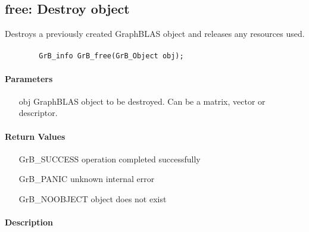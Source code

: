 \subsection{{\sf free}: Destroy object}

Destroys a previously created GraphBLAS object and releases any resources used.

\paragraph{\syntax}

\begin{verbatim}
        GrB_info GrB_free(GrB_Object obj);
\end{verbatim}


\paragraph{Parameters}

\begin{itemize}[leftmargin=1.1in]
	\item[{\sf obj}] GraphBLAS object to be destroyed. Can be a matrix, vector or descriptor.
\end{itemize}

\paragraph{Return Values}

\begin{itemize}[leftmargin=2.1in]
\item[{\sf GrB\_SUCCESS}]        operation completed successfully
\item[{\sf GrB\_PANIC}]          unknown internal error
\item[{\sf GrB\_NOOBJECT}]       object does not exist
\end{itemize}

\paragraph{Description}


